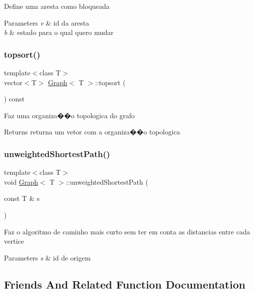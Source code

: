Define uma aresta como bloqueada 
\begin{DoxyParams}{Parameters}
{\em v} & id da aresta \\
\hline
{\em b} & estado para o qual quero mudar \\
\hline
\end{DoxyParams}
\mbox{\label{class_graph_a604df92d2a063f5d499e3ade282b73d5}} 
\subsubsection{\texorpdfstring{topsort()}{topsort()}}
{\footnotesize\ttfamily template$<$class T$>$ \\
vector$<$T$>$ \mbox{\hyperlink{class_graph}{Graph}}$<$ T $>$\+::topsort (\begin{DoxyParamCaption}{ }\end{DoxyParamCaption}) const}

Faz uma organiza��o topologica do grafo \begin{DoxyReturn}{Returns}
returna um vetor com a organiza��o topologica 
\end{DoxyReturn}
\mbox{\label{class_graph_aa033b71894f347b9050e1c547fb48b72}} 
\subsubsection{\texorpdfstring{unweighted\+Shortest\+Path()}{unweightedShortestPath()}}
{\footnotesize\ttfamily template$<$class T$>$ \\
void \mbox{\hyperlink{class_graph}{Graph}}$<$ T $>$\+::unweighted\+Shortest\+Path (\begin{DoxyParamCaption}\item[{const T \&}]{s }\end{DoxyParamCaption})}

Faz o algoritmo de caminho mais curto sem ter em conta as distancias entre cada vertice 
\begin{DoxyParams}{Parameters}
{\em s} & id de origem \\
\hline
\end{DoxyParams}


\subsection{Friends And Related Function Documentation}
\mbox{\label{class_graph_a78ed93177388d46d6f2e49b58f59e95e}} 
